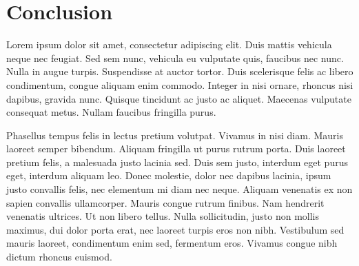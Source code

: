 \chapter{Conclusion}

Lorem ipsum dolor sit amet, consectetur adipiscing elit. Duis mattis vehicula neque nec feugiat. Sed sem nunc, vehicula eu vulputate quis, faucibus nec nunc. Nulla in augue turpis. Suspendisse at auctor tortor. Duis scelerisque felis ac libero condimentum, congue aliquam enim commodo. Integer in nisi ornare, rhoncus nisi dapibus, gravida nunc. Quisque tincidunt ac justo ac aliquet. Maecenas vulputate consequat metus. Nullam faucibus fringilla purus.

Phasellus tempus felis in lectus pretium volutpat. Vivamus in nisi diam. Mauris laoreet semper bibendum. Aliquam fringilla ut purus rutrum porta. Duis laoreet pretium felis, a malesuada justo lacinia sed. Duis sem justo, interdum eget purus eget, interdum aliquam leo. Donec molestie, dolor nec dapibus lacinia, ipsum justo convallis felis, nec elementum mi diam nec neque. Aliquam venenatis ex non sapien convallis ullamcorper. Mauris congue rutrum finibus. Nam hendrerit venenatis ultrices. Ut non libero tellus. Nulla sollicitudin, justo non mollis maximus, dui dolor porta erat, nec laoreet turpis eros non nibh. Vestibulum sed mauris laoreet, condimentum enim sed, fermentum eros. Vivamus congue nibh dictum rhoncus euismod.